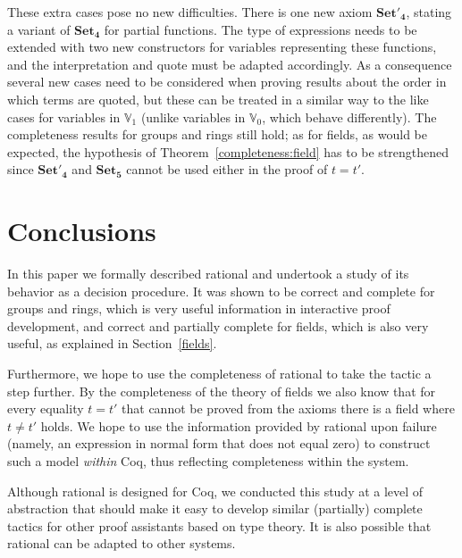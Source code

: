 \documentclass[numreferences]{kluwer}
\newcommand{\V}{{\mathbb V}}
\newcommand{\tacticname}[1]{\textsf{#1}}
\newcommand{\rational}{\tacticname{rational}}
\newcommand{\axiom}[1]{\ensuremath{\mathbf{#1}}}
\begin{document}
\begin{article}
These extra cases pose no new difficulties.
There is one new axiom \axiom{Set'_4}, stating a variant of
\axiom{Set_4} for partial functions.
The type of expressions needs to be extended with two new constructors
for variables representing these functions, and the interpretation and
quote must be adapted accordingly.
As a consequence several new cases need to be considered when proving
results about the order in which terms are quoted, but these can be
treated in a similar way to the like cases for variables in $\V_1$
(unlike variables in $\V_0$, which behave differently).
The completeness results for groups and rings still hold; as for
fields, as would be expected, the hypothesis of
Theorem~\ref{completeness:field} has to be strengthened since
\axiom{Set'_4} and \axiom{Set_5} cannot be used either in the proof of
$t=t'$.

\section{Conclusions}\label{concl}

In this paper we formally described {\rational} and undertook a study
of its behavior as a decision procedure.  It was shown to be correct
and complete for groups and rings, which is very useful information in
interactive proof development, and correct and partially complete for
fields, which is also very useful, as explained in Section~\ref{fields}.

Furthermore, we hope to use the completeness of {\rational} to take the
tactic a step further.  By the completeness of the theory of fields we
also know that for every equality $t=t'$ that cannot be proved from the
axioms there is a field where $t\neq t'$ holds.  We hope to use the
information provided by {\rational} upon failure (namely, an expression
in normal form that does not equal zero) to construct such a model
\emph{within} Coq, thus reflecting completeness within the system.

Although {\rational} is designed for Coq, we conducted this study at a
level of abstraction that should make it easy to develop similar
(partially) complete tactics for other proof assistants based on type
theory.  It is also possible that {\rational} can be adapted to other
systems.



\end{article}
\end{document}
